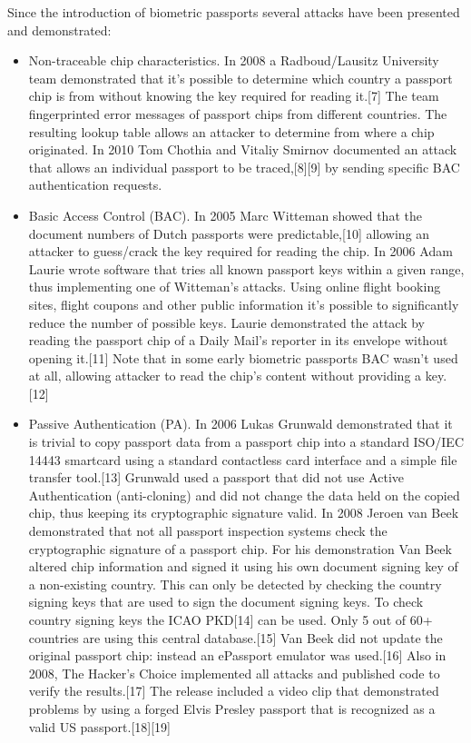 Since the introduction of biometric passports several attacks have been presented and demonstrated:

\begin{itemize}
	\item Non-traceable chip characteristics. In 2008 a Radboud/Lausitz University team demonstrated that it's possible to determine which country a passport chip is from without knowing the key required for reading it.[7] The team fingerprinted error messages of passport chips from different countries. The resulting lookup table allows an attacker to determine from where a chip originated. In 2010 Tom Chothia and Vitaliy Smirnov documented an attack that allows an individual passport to be traced,[8][9] by sending specific BAC authentication requests.
  \item Basic Access Control (BAC). In 2005 Marc Witteman showed that the document numbers of Dutch passports were predictable,[10] allowing an attacker to guess/crack the key required for reading the chip. In 2006 Adam Laurie wrote software that tries all known passport keys within a given range, thus implementing one of Witteman's attacks. Using online flight booking sites, flight coupons and other public information it's possible to significantly reduce the number of possible keys. Laurie demonstrated the attack by reading the passport chip of a Daily Mail's reporter in its envelope without opening it.[11] Note that in some early biometric passports BAC wasn't used at all, allowing attacker to read the chip's content without providing a key.[12]
  \item Passive Authentication (PA). In 2006 Lukas Grunwald demonstrated that it is trivial to copy passport data from a passport chip into a standard ISO/IEC 14443 smartcard using a standard contactless card interface and a simple file transfer tool.[13] Grunwald used a passport that did not use Active Authentication (anti-cloning) and did not change the data held on the copied chip, thus keeping its cryptographic signature valid. In 2008 Jeroen van Beek demonstrated that not all passport inspection systems check the cryptographic signature of a passport chip. For his demonstration Van Beek altered chip information and signed it using his own document signing key of a non-existing country. This can only be detected by checking the country signing keys that are used to sign the document signing keys. To check country signing keys the ICAO PKD[14] can be used. Only 5 out of 60+ countries are using this central database.[15] Van Beek did not update the original passport chip: instead an ePassport emulator was used.[16] Also in 2008, The Hacker's Choice implemented all attacks and published code to verify the results.[17] The release included a video clip that demonstrated problems by using a forged Elvis Presley passport that is recognized as a valid US passport.[18][19]

\end{itemize}
